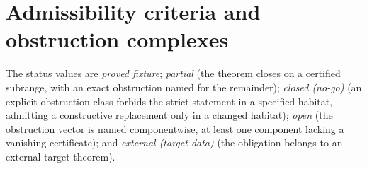 \section{Admissibility criteria and obstruction complexes}\label{sec:open-obligations}

\providecommand{\Status}[1]{\par\noindent\textsc{Status:}\ \emph{#1}}
\providecommand{\Witness}[1]{\par\noindent\textsc{Witness location:}\ #1}
\providecommand{\Gate}[1]{\par\noindent\textsc{Gate for advance:}\ #1}
\providecommand{\Oblig}[1]{\par\noindent\textsc{Obligation (#1).}\ }

The status values are \emph{proved fixture}; \emph{partial} (the
theorem closes on a certified subrange, with an exact obstruction
named for the remainder); \emph{closed (no-go)} (an explicit
obstruction class forbids the strict statement in a specified habitat,
admitting a constructive replacement only in a changed habitat);
\emph{open} (the obstruction vector is named componentwise, at least
one component lacking a vanishing certificate); and \emph{external
(target-data)} (the obligation belongs to an external target theorem).


